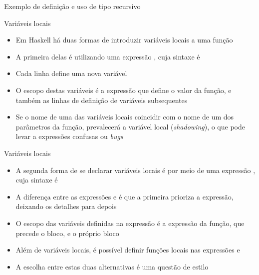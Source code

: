 \begin{frame}[fragile]{Exemplo de definição e uso de tipo recursivo}
\end{frame}

\begin{frame}[fragile]{Variáveis locais}

    \begin{itemize}
        \item Em Haskell há duas formas de introduzir variáveis locais a uma função

        \item A primeira delas é utilizando uma expressão , cuja sintaxe é


        \item Cada linha define uma nova variável

        \item O escopo destas variáveis é a expressão que define o valor da função, e também
            as linhas de definição de variáveis subsequentes

        \item Se o nome de uma das variáveis locais coincidir com o nome de um dos parâmetros da
            função, prevalecerá a variável local (\textit{shadowing}), o que pode levar a 
            expressões confusas ou \textit{bugs}

    \end{itemize}

\end{frame}

\begin{frame}[fragile]{Variáveis locais}

    \begin{itemize}
        \item A segunda forma de se declarar variáveis locais é por meio de uma expressão
            , cuja sintaxe é


        \item A diferença entre as expressões  e  é que
            a primeira prioriza a expressão, deixando os detalhes para depois

        \item O escopo das variáveis definidas na expressão  é a expressão
            da função, que precede o bloco, e o próprio bloco 

        \item Além de variáveis locais, é possível definir funções locais nas expressões
             e 

        \item A escolha entre estas duas alternativas é uma questão de estilo
    \end{itemize}

\end{frame}

